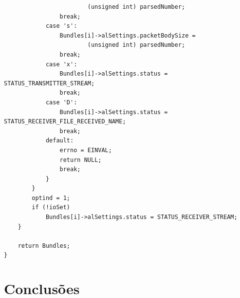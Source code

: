 \documentclass[a4paper]{article}
\begin{document}
\begin{verbatim}
                        (unsigned int) parsedNumber;
                break;
            case 's':
                Bundles[i]->alSettings.packetBodySize =
                        (unsigned int) parsedNumber;
                break;
            case 'x':
                Bundles[i]->alSettings.status = STATUS_TRANSMITTER_STREAM;
                break;
            case 'D':
                Bundles[i]->alSettings.status = STATUS_RECEIVER_FILE_RECEIVED_NAME;
                break;
            default:
                errno = EINVAL;
                return NULL;
                break;
            }
        }
        optind = 1;
        if (!ioSet)
            Bundles[i]->alSettings.status = STATUS_RECEIVER_STREAM;
    }

    return Bundles;
}
\end{verbatim}

\section{Conclusões}
\end{document}
